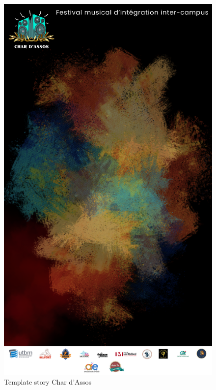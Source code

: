 \begin{figure}[!h]
    \begin{center}
        \includegraphics[scale=0.3]{ressources/Char_Dassos/1}
        \caption{Template story Char d'Assos \label{fig:storyCharDassos}}
    \end{center}
\end{figure}